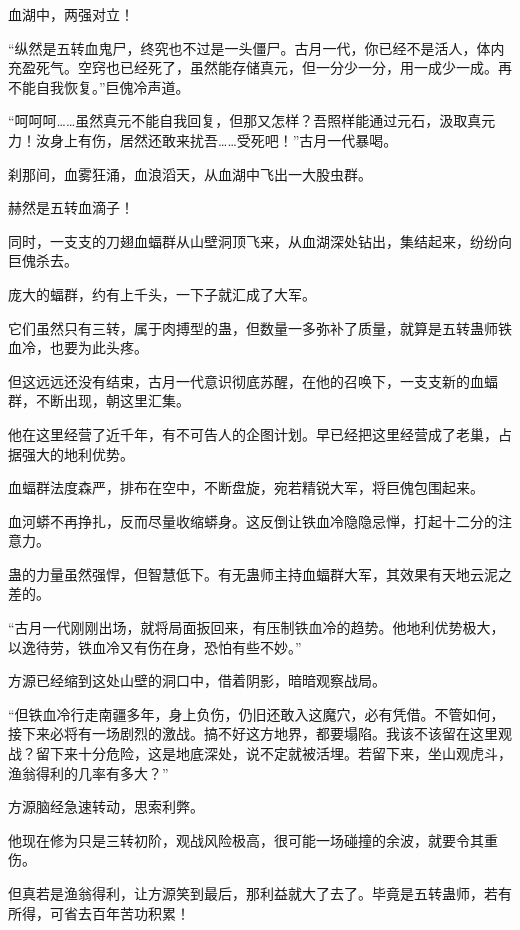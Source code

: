 
\begin{this_body}



血湖中，两强对立！

“纵然是五转血鬼尸，终究也不过是一头僵尸。古月一代，你已经不是活人，体内充盈死气。空窍也已经死了，虽然能存储真元，但一分少一分，用一成少一成。再不能自我恢复。”巨傀冷声道。

“呵呵呵……虽然真元不能自我回复，但那又怎样？吾照样能通过元石，汲取真元力！汝身上有伤，居然还敢来扰吾……受死吧！”古月一代暴喝。

刹那间，血雾狂涌，血浪滔天，从血湖中飞出一大股虫群。

赫然是五转血滴子！

同时，一支支的刀翅血蝠群从山壁洞顶飞来，从血湖深处钻出，集结起来，纷纷向巨傀杀去。

庞大的蝠群，约有上千头，一下子就汇成了大军。

它们虽然只有三转，属于肉搏型的蛊，但数量一多弥补了质量，就算是五转蛊师铁血冷，也要为此头疼。

但这远远还没有结束，古月一代意识彻底苏醒，在他的召唤下，一支支新的血蝠群，不断出现，朝这里汇集。

他在这里经营了近千年，有不可告人的企图计划。早已经把这里经营成了老巢，占据强大的地利优势。

血蝠群法度森严，排布在空中，不断盘旋，宛若精锐大军，将巨傀包围起来。

血河蟒不再挣扎，反而尽量收缩蟒身。这反倒让铁血冷隐隐忌惮，打起十二分的注意力。

蛊的力量虽然强悍，但智慧低下。有无蛊师主持血蝠群大军，其效果有天地云泥之差的。

“古月一代刚刚出场，就将局面扳回来，有压制铁血冷的趋势。他地利优势极大，以逸待劳，铁血冷又有伤在身，恐怕有些不妙。”

方源已经缩到这处山壁的洞口中，借着阴影，暗暗观察战局。

“但铁血冷行走南疆多年，身上负伤，仍旧还敢入这魔穴，必有凭借。不管如何，接下来必将有一场剧烈的激战。搞不好这方地界，都要塌陷。我该不该留在这里观战？留下来十分危险，这是地底深处，说不定就被活埋。若留下来，坐山观虎斗，渔翁得利的几率有多大？”

方源脑经急速转动，思索利弊。

他现在修为只是三转初阶，观战风险极高，很可能一场碰撞的余波，就要令其重伤。

但真若是渔翁得利，让方源笑到最后，那利益就大了去了。毕竟是五转蛊师，若有所得，可省去百年苦功积累！


\end{this_body}
